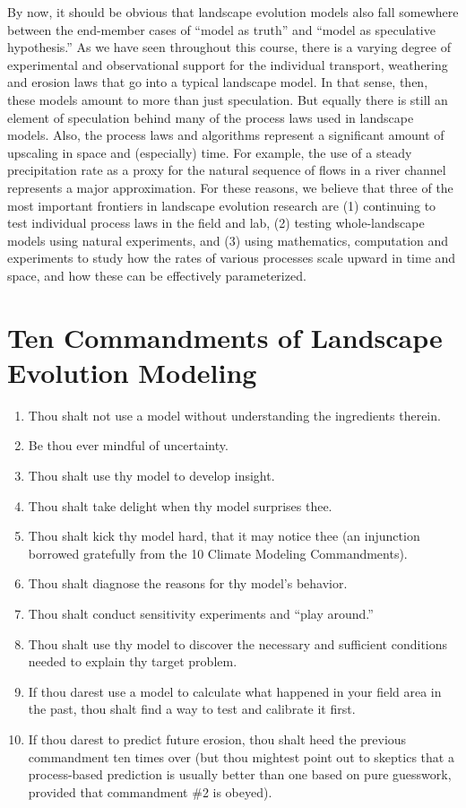 \documentclass[12pt,reqno]{amsart}
\begin{document}
By now, it should be obvious that landscape evolution models also fall
somewhere between the end-member cases of ``model as truth'' and
``model as speculative hypothesis.'' As we have seen throughout this course, there is a varying degree of experimental and observational support for the individual transport, weathering and erosion laws that go into a typical landscape model. In that sense, then, these models amount to more than just speculation. But equally there is still an element of speculation behind many of the process laws used in landscape models. Also, the process laws and algorithms represent a significant amount of upscaling in space and (especially) time. For example, the use of a steady precipitation rate as a proxy for the natural sequence of flows in a river channel represents a major approximation. For these reasons, we believe that three of the most important frontiers in landscape evolution research are (1) continuing to test individual process laws in the field and lab, (2) testing whole-landscape models using natural experiments, and (3) using mathematics, computation and experiments to study how the rates of various processes scale upward in time and space, and how these can be effectively parameterized.

\section{Ten Commandments of Landscape Evolution Modeling}

\begin{enumerate}
\item Thou shalt not use a model without understanding the ingredients therein.
\item Be thou ever mindful of uncertainty.
\item Thou shalt use thy model to develop insight.
\item Thou shalt take delight when thy model surprises thee.
\item Thou shalt kick thy model hard, that it may notice thee (an injunction borrowed gratefully from the 10 Climate Modeling Commandments).
\item Thou shalt diagnose the reasons for thy model's behavior.
\item Thou shalt conduct sensitivity experiments and ``play around.''
\item Thou shalt use thy model to discover the necessary and sufficient conditions needed to explain thy target problem.
\item If thou darest use a model to calculate what happened in your field area in the past, thou shalt find a way to test and calibrate it first.
\item If thou darest to predict future erosion, thou shalt heed the previous commandment ten times over (but thou mightest point out to skeptics that a process-based prediction is usually better than one based on pure guesswork, provided that commandment \#2 is obeyed).
\end{enumerate}
\end{document}
